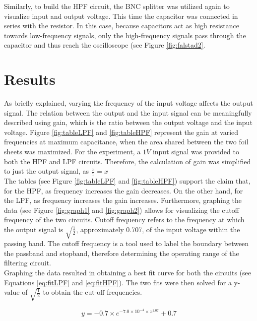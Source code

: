 \documentclass[journal]{IEEEtran}
\begin{document}
\noindent Similarly, to build the HPF circuit, the BNC splitter was utilized again to visualize input and output voltage. This time the capacitor was connected in series with the resistor. In this case, because capacitors act as high resistance towards low-frequency signals, only the high-frequency signals pass through the capacitor and thus reach the oscilloscope (see Figure \ref{fig:falstad2}.




\section{Results}

\noindent As briefly explained, varying the frequency of the input voltage affects the output signal. The relation between the output and the input signal can be meaningfully described using gain, which is the ratio between the output voltage and the input voltage. Figure \ref{fig:tableLPF} and \ref{fig:tableHPF} represent the gain at varied frequencies at maximum capacitance, when the area shared between the two foil sheets was maximized. For the experiment, a $1V$ input signal was provided to both the HPF and LPF circuits. Therefore, the calculation of gain was simplified to just the output signal, as $\frac{x}{1} = x$ \\

\noindent The tables (see Figure \ref{fig:tableLPF} and \ref{fig:tableHPF}) support the claim that, for the HPF, as frequency increases the gain decreases. On the other hand, for the LPF, as frequency increases the gain increases. Furthermore, graphing the data (see Figure \ref{fig:graph1} and \ref{fig:graph2}) allows for visualizing the cutoff frequency of the two circuits. Cutoff frequency refers to the frequency at which the output signal is $\sqrt{\frac{1}{2}}$, approximately 0.707, of the input voltage within the passing band. The cutoff frequency is a tool used to label the boundary between the passband and stopband, therefore determining the operating range of the filtering circuit.\\



\noindent Graphing the data resulted in obtaining a best fit curve for both the circuits (see Equations \ref{eq:fitLPF} and \ref{eq:fitHPF}). The two fits were then solved for a y-value of $\sqrt{\frac{1}{2}}$ to obtain the cut-off frequencies. 


\begin{equation}
y = -0.7 \times e^{-7.0 \times 10^{-4} \times x ^{1.07}}+0.7
\label{eq:fitLPF}
\end{equation}
\end{document}
